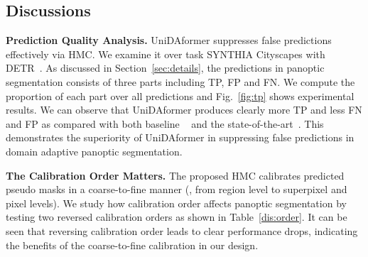 \documentclass[10pt,twocolumn,letterpaper]{article}
\begin{document}
\renewcommand\arraystretch{1.}
\begin{table}[t]
\centering
\begin{footnotesize}
\end{footnotesize}
\caption{Efficiency comparison with multi-branch panoptic adaptation network CVRN~\cite{huang2021cvrn} in terms of parameter number, training speed and inference speed.}
\label{dis:cvrn_p}
\end{table}





\subsection{Discussions}
\label{sec:dis}

\noindent \textbf{Prediction Quality Analysis.} UniDAformer suppresses false predictions effectively via HMC. We examine it over task SYNTHIA  Cityscapes with DETR~\cite{carion2020detr}. As discussed in Section~\ref{sec:details}, the predictions in panoptic segmentation consists of three parts including TP, FP and FN. We compute the proportion of each part over all predictions and Fig.~\ref{fig:tp} shows experimental results. We can observe that UniDAformer produces clearly more TP and less FN and FP as compared with both baseline ~\cite{carion2020detr} and the state-of-the-art~\cite{guan2021scale,huang2021cvrn}. This demonstrates the superiority of UniDAformer in suppressing false predictions in domain adaptive panoptic segmentation.

\noindent \textbf{The Calibration Order Matters.} The proposed HMC calibrates predicted pseudo masks in a coarse-to-fine manner (, from region level to superpixel and pixel levels). We study how calibration order affects panoptic segmentation by testing two reversed calibration orders as shown in Table~\ref{dis:order}. It can be seen that reversing calibration order leads to clear performance drops, indicating the benefits of the coarse-to-fine calibration in our design.
\end{document}
